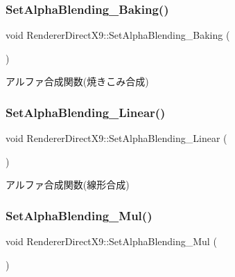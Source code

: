 \subsubsection{\texorpdfstring{Set\+Alpha\+Blending\+\_\+\+Baking()}{SetAlphaBlending\_Baking()}}
{\footnotesize\ttfamily void Renderer\+Direct\+X9\+::\+Set\+Alpha\+Blending\+\_\+\+Baking (\begin{DoxyParamCaption}{ }\end{DoxyParamCaption})}



アルファ合成関数(焼きこみ合成) 

\mbox{\label{class_renderer_direct_x9_abfb5264cbb0bf3bacc7b4ec416ddc05a}} 
\subsubsection{\texorpdfstring{Set\+Alpha\+Blending\+\_\+\+Linear()}{SetAlphaBlending\_Linear()}}
{\footnotesize\ttfamily void Renderer\+Direct\+X9\+::\+Set\+Alpha\+Blending\+\_\+\+Linear (\begin{DoxyParamCaption}{ }\end{DoxyParamCaption})}



アルファ合成関数(線形合成) 

\mbox{\label{class_renderer_direct_x9_a75dbeaa680610e655c6ff202591f50d7}} 
\subsubsection{\texorpdfstring{Set\+Alpha\+Blending\+\_\+\+Mul()}{SetAlphaBlending\_Mul()}}
{\footnotesize\ttfamily void Renderer\+Direct\+X9\+::\+Set\+Alpha\+Blending\+\_\+\+Mul (\begin{DoxyParamCaption}{ }\end{DoxyParamCaption})}



